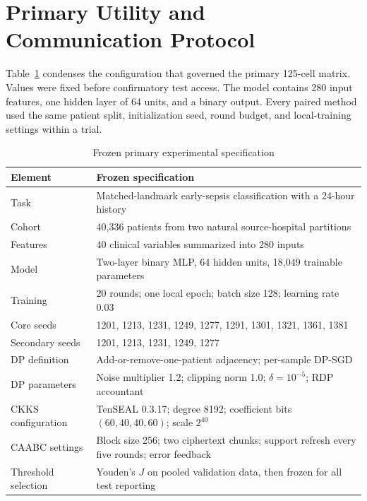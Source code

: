 \section{Primary Utility and Communication Protocol}
\label{appsec:primary-protocol}

Table~\ref{tab:primary-protocol-specification} condenses the configuration that governed the primary 125-cell matrix. Values were fixed before confirmatory test access. The model contains 280 input features, one hidden layer of 64 units, and a binary output. Every paired method used the same patient split, initialization seed, round budget, and local-training settings within a trial.

\begin{table}[htbp]
    \centering
    \caption{Frozen primary experimental specification}
    \label{tab:primary-protocol-specification}
    \begin{tabularx}{\textwidth}{@{}lX@{}}
        \toprule
        Element & Frozen specification \\
        \midrule
        Task & Matched-landmark early-sepsis classification with a 24-hour history \\
        Cohort & 40,336 patients from two natural source-hospital partitions \\
        Features & 40 clinical variables summarized into 280 inputs \\
        Model & Two-layer binary MLP, 64 hidden units, 18,049 trainable parameters \\
        Training & 20 rounds; one local epoch; batch size 128; learning rate 0.03 \\
        Core seeds & 1201, 1213, 1231, 1249, 1277, 1291, 1301, 1321, 1361, 1381 \\
        Secondary seeds & 1201, 1213, 1231, 1249, 1277 \\
        DP definition & Add-or-remove-one-patient adjacency; per-sample DP-SGD \\
        DP parameters & Noise multiplier 1.2; clipping norm 1.0; $\delta=10^{-5}$; RDP accountant \\
        CKKS configuration & TenSEAL 0.3.17; degree 8192; coefficient bits $(60,40,40,60)$; scale $2^{40}$ \\
        CAABC settings & Block size 256; two ciphertext chunks; support refresh every five rounds; error feedback \\
        Threshold selection & Youden's $J$ on pooled validation data, then frozen for all test reporting \\
        \bottomrule
    \end{tabularx}
\end{table}

